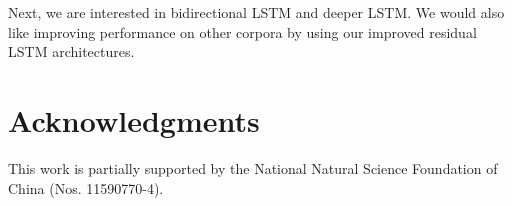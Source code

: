 \documentclass[a4paper]{article}
\begin{document}
Next, we are interested in bidirectional LSTM \cite{blstm} and deeper LSTM.
We would also like improving performance on other corpora by using our improved residual LSTM architectures.

\section{Acknowledgments}
This work is partially supported by the National Natural Science Foundation of China (Nos. 11590770-4).

  \eightpt
  

  

\end{document}
